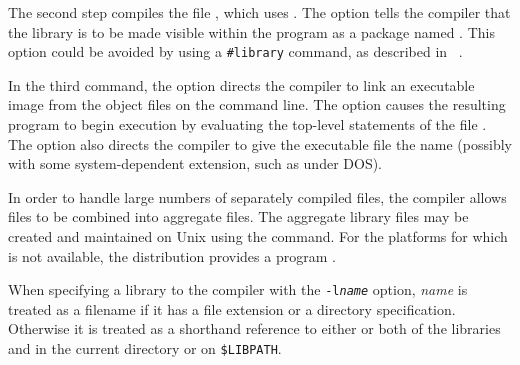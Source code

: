 The second step compiles the file ,
which uses .
The  option tells the compiler that the
library  is to be made visible within the program
as a package named .
This  option could be avoided by using a \verb"#library"
command, as described in ~.

In the third command, the  option directs the compiler
to link an executable image from the object files on the command line.
The  option causes the resulting program to begin execution
by evaluating the top-level statements of the file .
The  option also directs the compiler to give the executable
file the name  (possibly with some system-dependent extension,
such as  under DOS).


%
In order to handle large numbers of separately compiled files,
the \asharp{} compiler allows  files to be combined
into aggregate  files.  The aggregate library files
may be created and maintained on Unix using the  command.
For the platforms for which  is not available, the \asharp{}
distribution provides a program .

When specifying a library to the compiler with the {\tt -l{\it name}} option,
{\it name} is treated as a filename if it has a file extension or a
directory specification.  Otherwise it is treated as a shorthand reference
to either or both of the libraries  and
 in the current directory or on {\tt \$LIBPATH}. 

